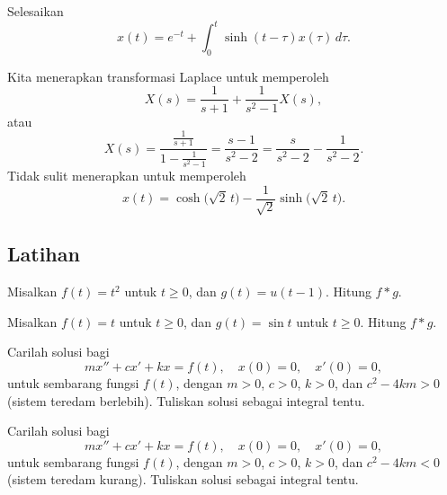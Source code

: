 \begin{example}
Selesaikan
\begin{equation*}
x(t) =  e^{-t} + \int_0^t \sinh(t-\tau) x(\tau) \, d\tau .
\end{equation*}

Kita menerapkan transformasi Laplace untuk memperoleh
\begin{equation*}
X(s) = \frac{1}{s+1} + \frac{1}{s^2-1} X(s) ,
\end{equation*}
atau
\begin{equation*}
X(s) = \frac{\frac{1}{s+1}}{1- \frac{1}{s^2-1}}
=
\frac{s-1}{s^2 - 2}
=
\frac{s}{s^2 - 2}
-
\frac{1}{s^2 - 2} .
\end{equation*}
Tidak sulit menerapkan  untuk memperoleh
\begin{equation*}
x(t) = \cosh \bigl( \sqrt{2} \, t \bigr) -
\frac{1}{\sqrt{2}} \sinh \bigl( \sqrt{2}\, t \bigr).
\end{equation*}
\end{example}

\subsection{Latihan}

\begin{exercise}
Misalkan $f(t) = t^2$ untuk $t \geq 0$, dan $g(t) = u(t-1)$.  Hitung
$f * g$.
\end{exercise}

\begin{exercise}
Misalkan $f(t) = t$ untuk $t \geq 0$, dan $g(t) = \sin t $ untuk $t \geq 0$.  Hitung
$f * g$.
\end{exercise}

\begin{exercise}
Carilah solusi bagi
\begin{equation*}
m x'' + c x' + k x = f(t) , \quad x(0) = 0, \quad x'(0) = 0 ,
\end{equation*}
untuk sembarang fungsi $f(t)$, dengan $m > 0$, $c > 0$, $k > 0$,
dan $c^2 - 4km > 0$ (sistem teredam berlebih).
Tuliskan solusi sebagai integral tentu.
\end{exercise}

\begin{exercise}
Carilah solusi bagi
\begin{equation*}
m x'' + c x' + k x = f(t) , \quad x(0) = 0, \quad x'(0) = 0 ,
\end{equation*}
untuk sembarang fungsi $f(t)$, dengan $m > 0$, $c > 0$, $k > 0$,
dan $c^2 - 4km < 0$ (sistem teredam kurang).
Tuliskan solusi sebagai integral tentu.
\end{exercise}

